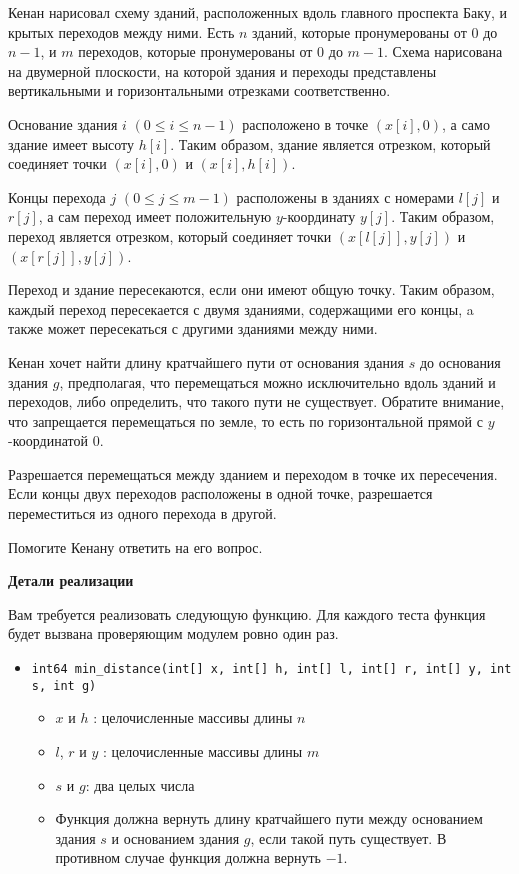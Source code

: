 Кенан нарисовал схему зданий, расположенных вдоль главного проспекта Баку, и крытых переходов между ними. Есть $n$ зданий, которые пронумерованы от $0$ до $n-1$, и $m$ переходов, которые пронумерованы от $0$ до $m-1$. Схема нарисована на двумерной плоскости, на которой здания и переходы представлены вертикальными и горизонтальными отрезками соответственно.

Основание здания $i$ $(0 \leq i \leq n-1)$ расположено в точке $(x[i], 0)$, а само здание имеет высоту $h[i]$. Таким образом, здание является отрезком, который соединяет точки $(x[i], 0)$ и $(x[i], h[i])$.

Концы перехода $j$ $(0 \leq j \leq m-1)$ расположены в зданиях с номерами $l[j]$ и $r[j]$, а сам переход имеет положительную $y$-координату $y[j]$. Таким образом, переход является отрезком, который соединяет точки $(x[l[j]], y[j])$ и $(x[r[j]], y[j])$.

Переход и здание пересекаются, если они имеют общую точку. Таким образом, каждый переход пересекается с двумя зданиями, содержащими его концы, a также может пересекаться с другими зданиями между ними.

Кенан хочет найти длину кратчайшего пути от основания здания $s$ до основания здания $g$, предполагая, что перемещаться можно исключительно вдоль зданий и переходов, либо определить, что такого пути не существует. Обратите внимание, что запрещается перемещаться по земле, то есть по горизонтальной прямой с $y$-координатой $0$.

Разрешается перемещаться между зданием и переходом в точке их пересечения. Если концы двух переходов расположены в одной точке, разрешается переместиться из одного перехода в другой.

Помогите Кенану ответить на его вопрос.


\textbf{Детали реализации}

Вам требуется реализовать следующую функцию. Для каждого теста функция будет вызвана проверяющим модулем ровно один раз.

\begin{itemize}
\item \texttt{int64 min\_distance(int[] x, int[] h, int[] l, int[] r, int[] y,
                   int s, int g)}
\begin{itemize}
\item $x$ и $h$ : целочисленные массивы длины $n$
\item $l$, $r$ и $y$ : целочисленные массивы длины $m$
\item $s$ и $g$: два целых числа
\item Функция должна вернуть длину кратчайшего пути между основанием здания $s$ и основанием здания $g$, если такой путь существует. В противном случае функция должна вернуть $-1$.
\end{itemize}
\end{itemize}
